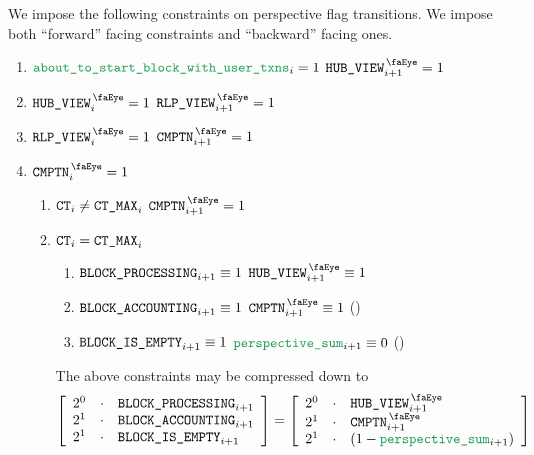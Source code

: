 We impose the following constraints on perspective flag transitions.
We impose both
``forward''  facing constraints and
``backward'' facing ones.
\begin{enumerate}
	\item \If $\aboutToStartBlockWithUserTransactions _{i} = 1$ \Then $\isUserTxnHubView _{i + 1} = 1$
	\item \If $\isUserTxnHubView     _{i} = 1$ \Then $\isUserTxnRlpView     _{i + 1} = 1$
	\item \If $\isUserTxnRlpView     _{i} = 1$ \Then $\isUserTxnComputation _{i + 1} = 1$
	\item \If $\isUserTxnComputation _{i} = 1$ \Then
		\begin{enumerate}
			\item \If $\texttt{CT} _{i} \neq \texttt{CT\_MAX} _{i}$ \Then $\isUserTxnComputation _{i + 1} = 1$
			\item \If $\texttt{CT} _{i} =    \texttt{CT\_MAX} _{i}$ \Then
				\begin{enumerate}
					\item \If $\texttt{BLOCK\_PROCESSING} _{i + 1} \equiv 1$ \Then $\isUserTxnHubView     _{i + 1} \equiv 1$
					\item \If $\texttt{BLOCK\_ACCOUNTING} _{i + 1} \equiv 1$ \Then $\isUserTxnComputation _{i + 1} \equiv 1$ (\sanityCheck)
					\item \If $\texttt{BLOCK\_IS\_EMPTY}    _{i + 1} \equiv 1$ \Then $\perspectiveSum       _{i + 1} \equiv 0$ (\sanityCheck)
				\end{enumerate}
				\saNote{}
				The above constraints may be compressed down to
				\[
					\left[ \begin{array}{rcl}
						2^{0} & \cdot & \blockProcessing _{i + 1} \\
						2^{1} & \cdot & \blockAccounting _{i + 1} \\
						2^{1} & \cdot & \blockIsEmpty    _{i + 1} \\
					\end{array} \right]
					=
					\left[ \begin{array}{rcl}
						2^{0} & \cdot & \isUserTxnHubView     _{i + 1}       \\
						2^{1} & \cdot & \isUserTxnComputation _{i + 1}       \\
						2^{1} & \cdot & (1 - \perspectiveSum  _{i + 1}) \\
					\end{array} \right]
				\]
		\end{enumerate}
\end{enumerate}
